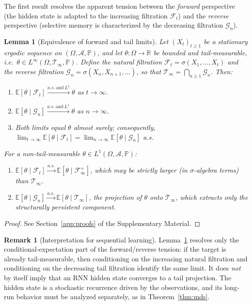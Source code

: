 \documentclass[bj,authoryear]{imsart}
\theoremstyle{plain}
\newtheorem{lemma}[theorem]{Lemma}
\theoremstyle{definition}
\newtheorem{remark}[theorem]{Remark}
\newcommand{\E}{\mathbb{E}}
\newcommand{\Prob}{\mathbb{P}}
\newcommand{\R}{\mathbb{R}}
\newcommand{\F}{\mathcal{F}}
\newcommand{\G}{\mathcal{G}}
\newcommand{\A}{\mathcal{A}}
\newcommand{\Tsig}{\mathcal{T}_\infty}
\newcommand{\given}{\mid}
\begin{document}
The first result resolves the apparent tension between the \emph{forward}
perspective (the hidden state is adapted to the increasing filtration $\F_t$)
and the \emph{reverse} perspective (selective memory is characterized by the
decreasing filtration $\G_n$).

\begin{lemma}[Equivalence of forward and tail limits]
\label{lem:equiv}
  Let $(X_t)_{t\geq 1}$ be a stationary ergodic sequence on $(\Omega,\A,\Prob)$,
  and let $\theta : \Omega \to \R$ be bounded and tail-measurable,
  i.e.\ $\theta \in L^\infty(\Omega, \Tsig, \Prob)$.
  Define the natural filtration $\F_t = \sigma(X_1,\ldots,X_t)$ and
  the reverse filtration $\G_n = \sigma(X_n,X_{n+1},\ldots)$,
  so that $\Tsig = \bigcap_{n\geq 1}\G_n$.  Then:
  \begin{enumerate}[label=(\alph*), itemsep=3pt]
    \item $\E[\theta\given\F_t] \xrightarrow{a.s.\ \text{and}\ L^1} \theta$
      as $t \to \infty$.
    \item $\E[\theta\given\G_n] \xrightarrow{a.s.\ \text{and}\ L^1} \theta$
      as $n \to \infty$.
    \item Both limits equal $\theta$ almost surely; consequently,
      $\lim_{t\to\infty}\E[\theta\given\F_t] = \lim_{n\to\infty}\E[\theta\given\G_n]$
      a.s.
  \end{enumerate}
  For a non-tail-measurable $\theta \in L^1(\Omega,\A,\Prob)$:
  \begin{enumerate}[label=(\alph*), start=4, itemsep=3pt]
    \item $\E[\theta\given\F_t] \xrightarrow{a.s.} \E[\theta\given\F_\infty^+]$,
      which may be strictly larger (in $\sigma$-algebra terms) than $\Tsig$.
    \item $\E[\theta\given\G_n] \xrightarrow{a.s.} \E[\theta\given\Tsig]$,
      the projection of $\theta$ onto $\Tsig$, which extracts only the
      structurally persistent component.
  \end{enumerate}
\end{lemma}

\begin{proof}
  See Section~\ref{app:proofs} of the Supplementary Material.
\end{proof}

\begin{remark}[Interpretation for sequential learning]
\label{rem:interp-lemma}
  Lemma~\ref{lem:equiv} resolves only the conditional-expectation part of the
  forward/reverse tension: if the target is already tail-measurable, then
  conditioning on the increasing natural filtration and conditioning on the
  decreasing tail filtration identify the same limit.  It does \emph{not} by
  itself imply that an RNN hidden state converges to a tail projection.  The
  hidden state is a stochastic recurrence driven by the observations, and its
  long-run behavior must be analyzed separately, as in
  Theorem~\ref{thm:mds}.
\end{remark}
\end{document}
